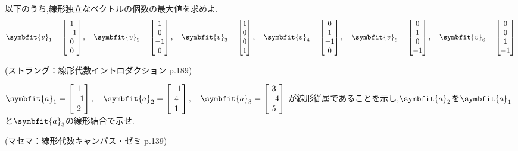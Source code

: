 以下のうち,線形独立なベクトルの個数の最大値を求めよ.
\[
    \symbfit{v}_1 = \begin{bmatrix}1\\-1\\0\\0 \end{bmatrix}, \quad 
    \symbfit{v}_2 = \begin{bmatrix}1\\0\\-1\\0 \end{bmatrix}, \quad 
    \symbfit{v}_3 = \begin{bmatrix}1\\0\\0\\1 \end{bmatrix}, \quad 
    \symbfit{v}_4 = \begin{bmatrix}0\\1\\-1\\0 \end{bmatrix}, \quad 
    \symbfit{v}_5 = \begin{bmatrix}0\\1\\0\\-1 \end{bmatrix}, \quad 
    \symbfit{v}_6 = \begin{bmatrix}0\\0\\1\\-1 \end{bmatrix} 
\]
\begin{flushright}
    (ストラング：線形代数イントロダクション p.189)
\end{flushright}

$
    \symbfit{a}_1 = \begin{bmatrix}1\\-1\\2 \end{bmatrix}, \quad 
    \symbfit{a}_2 = \begin{bmatrix}-1\\4\\1 \end{bmatrix}, \quad 
    \symbfit{a}_3 = \begin{bmatrix}3\\-4\\5 \end{bmatrix}
$
が線形従属であることを示し,$\symbfit{a}_2$を$\symbfit{a}_1$と$\symbfit{a}_3$の線形結合で示せ.
\begin{flushright}
    (マセマ：線形代数キャンパス・ゼミ p.139)
\end{flushright}

